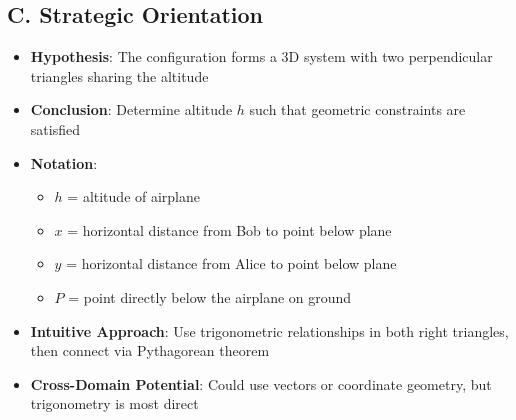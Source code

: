\documentclass[12pt]{article}
\begin{document}
\begin{problemconfigbox}
\subsection*{C. Strategic Orientation}
\begin{itemize}[leftmargin=*]
    \item \textbf{Hypothesis}: The configuration forms a 3D system with two perpendicular triangles sharing the altitude
    \item \textbf{Conclusion}: Determine altitude $h$ such that geometric constraints are satisfied
    \item \textbf{Notation}: 
    \begin{itemize}
        \item $h$ = altitude of airplane
        \item $x$ = horizontal distance from Bob to point below plane
        \item $y$ = horizontal distance from Alice to point below plane
        \item $P$ = point directly below the airplane on ground
    \end{itemize}
    \item \textbf{Intuitive Approach}: Use trigonometric relationships in both right triangles, then connect via Pythagorean theorem
    \item \textbf{Cross-Domain Potential}: Could use vectors or coordinate geometry, but trigonometry is most direct
\end{itemize}
\end{problemconfigbox}
\end{document}
